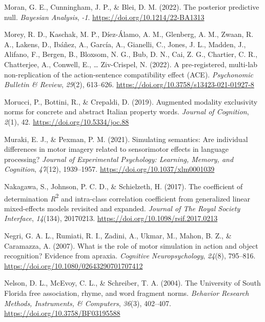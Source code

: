 \documentclass[
  12pt,
  man,floatsintext]{apa7}
\newlength{\cslhangindent}
\newlength{\cslentryspacingunit} %
\newenvironment{CSLReferences}[2] %
 {%
  \setlength{\parindent}{0pt}
  \ifodd #1
  \let\oldpar\par
  \def\par{\hangindent=\cslhangindent\oldpar}
  \fi
  \setlength{\parskip}{#2\cslentryspacingunit}
 }%
 {}
\begin{document}
\begin{CSLReferences}{1}{0}
\leavevmode{}%
Moran, G. E., Cunningham, J. P., \& Blei, D. M. (2022). The posterior predictive null. \emph{Bayesian Analysis}, \emph{-1}. \url{https://doi.org/10.1214/22-BA1313}

\leavevmode{}%
Morey, R. D., Kaschak, M. P., Díez-Álamo, A. M., Glenberg, A. M., Zwaan, R. A., Lakens, D., Ibáñez, A., García, A., Gianelli, C., Jones, J. L., Madden, J., Alifano, F., Bergen, B., Bloxsom, N. G., Bub, D. N., Cai, Z. G., Chartier, C. R., Chatterjee, A., Conwell, E., \ldots{} Ziv-Crispel, N. (2022). A pre-registered, multi-lab non-replication of the action-sentence compatibility effect ({ACE}). \emph{Psychonomic Bulletin \& Review}, \emph{29}(2), 613--626. \url{https://doi.org/10.3758/s13423-021-01927-8}

\leavevmode{}%
Morucci, P., Bottini, R., \& Crepaldi, D. (2019). Augmented modality exclusivity norms for concrete and abstract {Italian} property words. \emph{Journal of Cognition}, \emph{2}(1), 42. \url{https://doi.org/10.5334/joc.88}

\leavevmode{}%
Muraki, E. J., \& Pexman, P. M. (2021). Simulating semantics: {Are} individual differences in motor imagery related to sensorimotor effects in language processing? \emph{Journal of Experimental Psychology: Learning, Memory, and Cognition}, \emph{47}(12), 1939--1957. \url{https://doi.org/10.1037/xlm0001039}

\leavevmode{}%
Nakagawa, S., Johnson, P. C. D., \& Schielzeth, H. (2017). The coefficient of determination {\emph{R}}{\textsuperscript{2}} and intra-class correlation coefficient from generalized linear mixed-effects models revisited and expanded. \emph{Journal of The Royal Society Interface}, \emph{14}(134), 20170213. \url{https://doi.org/10.1098/rsif.2017.0213}

\leavevmode{}%
Negri, G. A. L., Rumiati, R. I., Zadini, A., Ukmar, M., Mahon, B. Z., \& Caramazza, A. (2007). What is the role of motor simulation in action and object recognition? {Evidence} from apraxia. \emph{Cognitive Neuropsychology}, \emph{24}(8), 795--816. \url{https://doi.org/10.1080/02643290701707412}

\leavevmode{}%
Nelson, D. L., McEvoy, C. L., \& Schreiber, T. A. (2004). The {University} of {South Florida} free association, rhyme, and word fragment norms. \emph{Behavior Research Methods, Instruments, \& Computers}, \emph{36}(3), 402--407. \url{https://doi.org/10.3758/BF03195588}


\end{CSLReferences}
\end{document}
